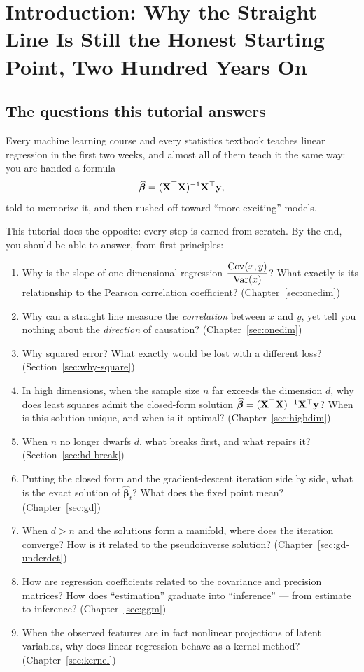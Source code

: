 \section[Introduction: the honest starting point]{Introduction: Why the Straight Line Is Still the Honest Starting Point, Two Hundred Years On}\label{sec:intro}

\subsection{The questions this tutorial answers}

Every machine learning course and every statistics textbook teaches linear regression in the first two weeks, and almost all of them teach it the same way: you are handed a formula
\[
  \widehat{\bm{\beta}} = (\mathbf{X}^\top \mathbf{X})^{-1} \mathbf{X}^\top \mathbf{y},
\]
told to memorize it, and then rushed off toward ``more exciting'' models.

This tutorial does the opposite: every step is earned from scratch. By the end, you should be able to answer, from first principles:

\begin{enumerate}[label=(\arabic*)]
  \item Why is the slope of one-dimensional regression $\dfrac{\mathrm{Cov}(x,y)}{\mathrm{Var}(x)}$? What exactly is its relationship to the Pearson correlation coefficient? (Chapter~\ref{sec:onedim})
  \item Why can a straight line measure the \textit{correlation} between $x$ and $y$, yet tell you nothing about the \textit{direction} of causation? (Chapter~\ref{sec:onedim})
  \item Why squared error? What exactly would be lost with a different loss? (Section~\ref{sec:why-square})
  \item In high dimensions, when the sample size $n$ far exceeds the dimension $d$, why does least squares admit the closed-form solution $\widehat{\bm{\beta}} = (\mathbf{X}^\top\mathbf{X})^{-1}\mathbf{X}^\top\mathbf{y}$? When is this solution unique, and when is it optimal? (Chapter~\ref{sec:highdim})
  \item When $n$ no longer dwarfs $d$, what breaks first, and what repairs it? (Section~\ref{sec:hd-break})
  \item Putting the closed form and the gradient-descent iteration side by side, what is the exact solution of $\widehat{\bm{\beta}}_t$? What does the fixed point mean? (Chapter~\ref{sec:gd})
  \item When $d > n$ and the solutions form a manifold, where does the iteration converge? How is it related to the pseudoinverse solution? (Chapter~\ref{sec:gd-underdet})
  \item How are regression coefficients related to the covariance and precision matrices? How does ``estimation'' graduate into ``inference'' --- from estimate to inference? (Chapter~\ref{sec:ggm})
  \item When the observed features are in fact nonlinear projections of latent variables, why does linear regression behave as a kernel method? (Chapter~\ref{sec:kernel})
\end{enumerate}


